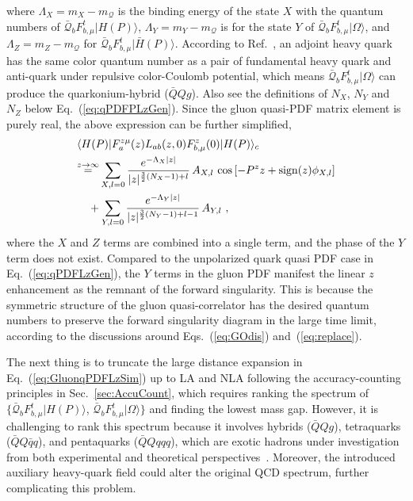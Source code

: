 \documentclass[a4paper,11pt]{article}
\begin{document}
where $\Lambda_X=m_X-m_{\mathcal{Q}}$ is the binding energy of the state $X$ with the quantum numbers of $\bar{\mathcal{Q}}_{b} F^{t}_{b,\mu} | H(P) \rangle$, $\Lambda_Y=m_Y-m_{\mathcal{Q}}$ is for the state $Y$ of $\bar{\mathcal{Q}}_{b} F^{t}_{b,\mu}  | \Omega \rangle$, and $\Lambda_Z=m_Z-m_{\mathcal{Q}}$ for $\bar{\mathcal{Q}}_{b} F^{t}_{b,\mu} | \bar{H}(P) \rangle$. According to Ref.~\cite{Bruschini2025JLabSeminar}, an adjoint heavy quark has the same color quantum number as a pair of fundamental heavy quark and anti-quark under repulsive color-Coulomb potential, which means $\bar{\mathcal{Q}}_{b} F^{t}_{b,\mu}  | \Omega \rangle$ can produce the quarkonium-hybrid ($\bar{Q}Q g$). Also see the definitions of $N_X$, $N_Y$ and $N_Z$ below Eq.~(\ref{eq:qPDFPLzGen}). Since the gluon quasi-PDF matrix element is purely real, the above expression can be further simplified,
\begin{align}\label{eq:GluonqPDFLzSim}
&\langle H(P) | F^{z\mu}_{a}(z) L_{ab}(z,0) F^{z}_{b,\mu}(0) | H(P) \rangle_c   \nonumber\\
&{\overset{z\rightarrow \infty}{=}}   
 \sum_{X,l=0} \frac{e^{-\Lambda_X |z| }}{|z|^{\frac{3}{2}(N_X-1)+l}} \, A_{X,l} \, \cos\left[-P^z z + {\rm sign}(z) \phi_{X,l}\right]  \nonumber\\
&\quad + \sum_{Y,l=0} \frac{e^{-\Lambda_Y |z|}}{|z|^{\frac{3}{2}(N_Y-1)+l-1}} \, A_{Y,l}  \ ,
\end{align}
where the $X$ and $Z$ terms are combined into a single term, and the phase of the $Y$ term does not exist. Compared to the unpolarized quark quasi PDF case in Eq.~(\ref{eq:qPDFLzGen}), the $Y$ terms in the gluon PDF manifest the linear $z$ enhancement as the remnant of the forward singularity. This is because the symmetric structure of the gluon quasi-correlator has the desired quantum numbers to preserve the forward singularity diagram in the large time limit, according to the discussions around Eqs.~(\ref{eq:GOdis}) and~(\ref{eq:replace}).

The next thing is to truncate the large distance expansion in Eq.~(\ref{eq:GluonqPDFLzSim}) up to LA and NLA following the accuracy-counting principles in Sec.~\ref{sec:AccuCount}, which requires ranking the spectrum of $\{\bar{\mathcal{Q}}_{b} F^{t}_{b,\mu} | H(P) \rangle$, $\bar{\mathcal{Q}}_{b} F^{t}_{b,\mu} | \Omega \rangle \}$ and finding the lowest mass gap. However, it is challenging to rank this spectrum because it involves hybrids ($\bar{Q}Q g$), tetraquarks ($\bar{Q}Q \bar{q}q$), and pentaquarks ($\bar{Q}Q qqq$), which are exotic hadrons under investigation from both experimental and theoretical perspectives~\cite{Guo:2017jvc,Ali:2017jda,Olsen:2017bmm,Brambilla:2019esw,Liu:2019zoy,Chen:2022asf,Berwein:2024ztx}. Moreover, the introduced auxiliary heavy-quark field could alter the original QCD spectrum, further complicating this problem.
\end{document}
